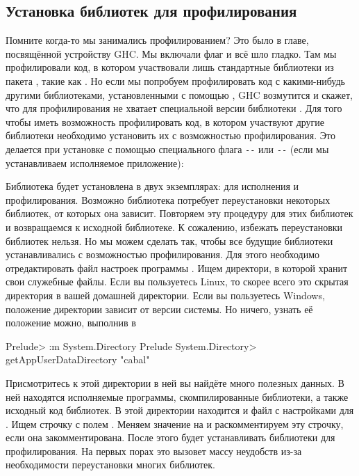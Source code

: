 \subsection{Установка библиотек для профилирования}

Помните когда-то мы занимались профилированием? 
Это было в главе, посвящённой устройству GHC. Мы включали
флаг  и всё шло гладко. Там мы профилировали
код, в котором участвовали лишь стандартные библиотеки
из пакета , такие как . Но если мы 
попробуем профилировать код с какими-нибудь другими
библиотеками, установленными с помощью , 
GHC возмутится и скажет, что для профилирования 
не хватает специальной версии библиотеки .
Для того чтобы иметь возможность профилировать код, в котором
участвуют другие библиотеки необходимо установить их
с возможностью профилирования. Это делается при установке
с помощью специального флага \verb!--!
или \verb!--! (если мы устанавливаем 
исполняемое приложение):


Библиотека будет установлена в двух экземплярах:
для исполнения и профилирования.
Возможно библиотека  потребует переустановки
некоторых библиотек, от которых она зависит. Повторяем
эту процедуру для этих библиотек и возвращаемся к 
исходной библиотеке. К сожалению, избежать переустановки
библиотек нельзя. Но мы можем сделать так, чтобы все 
будущие библиотеки устанавливались с возможностью профилирования.
Для этого необходимо отредактировать файл настроек программы
. Ищем директори, в которой  хранит свои служебные
файлы. Если вы пользуетесь Linux, то скорее всего это скрытая
директория  в вашей домашней директории. Если вы пользуетесь
Windows, положение директории зависит от версии системы.
Но ничего, узнать её положение можно, выполнив в 

\begin{code}
Prelude> :m System.Directory
Prelude System.Directory> getAppUserDataDirectory "cabal"
\end{code}

Присмотритесь к этой директории в ней вы найдёте много 
полезных данных. В ней находятся исполняемые программы,
скомпилированные библиотеки, а также исходный код 
библиотек.
В этой директории находится и файл 
с настройками для . Ищем строчку
с полем . Меняем значение
на  и раскомментируем эту строчку, если она закомментирована.
После этого  будет устанавливать библиотеки
для профилирования. На первых порах это вызовет массу неудобств 
из-за необходимости переустановки многих библиотек. 


